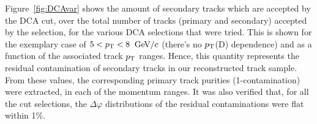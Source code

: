 Figure~\ref{fig:DCAvar} shows the amount of secondary tracks which are accepted by the DCA cut, over the total number of tracks (primary and secondary) accepted by the selection, for the various DCA selections that were tried. This is shown for the exemplary case of $5 < p_{\rm T} < 8$ $\mathrm{GeV}/c$ (there's no $p_{\rm T}$(D) dependence) and as a function of the associated track $p_{\rm T}$ ranges. Hence, this quantity represents the residual contamination of secondary tracks in our reconstructed track sample. From these values, the corresponding primary track purities (1-contamination) were extracted, in each of the momentum ranges.
It was also verified that, for all the cut selections, the $\Delta\varphi$ distributions of the residual contaminations were flat within 1\%.


